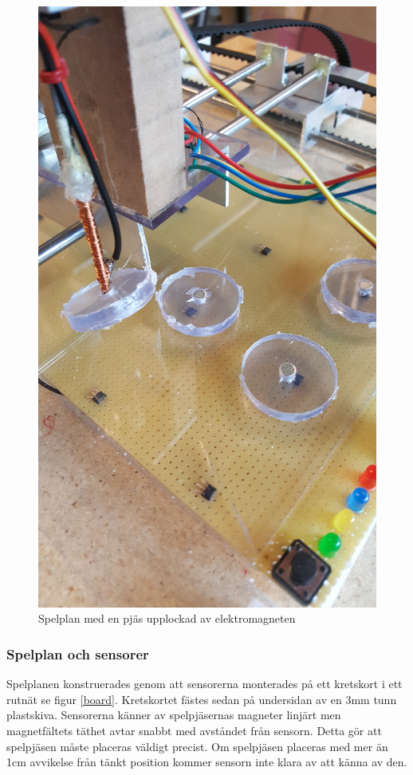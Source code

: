 \documentclass[a4paper]{article}
\begin{document}
\begin{figure}\label{elektromagnet}
\centering
\includegraphics[scale=0.6]{../images/elektromagnet}
\caption{Spelplan med en pjäs upplockad av elektromagneten}
\end{figure}

\subsubsection{Spelplan och sensorer}
Spelplanen konstruerades genom att sensorerna monterades på ett kretskort i ett rutnät se figur \ref{board}.
Kretskortet fästes sedan på undersidan av en 3mm tunn plastskiva.
Sensorerna känner av spelpjäsernas magneter linjärt men magnetfältets täthet avtar snabbt med avståndet från sensorn.
Detta gör att spelpjäsen måste placeras väldigt precist.
Om spelpjäsen placeras med mer än 1cm avvikelse från tänkt position kommer sensorn inte klara av att känna av den.
\end{document}
